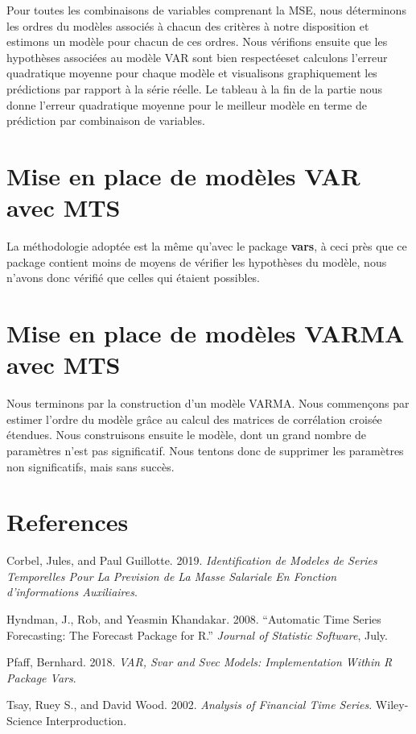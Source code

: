 \documentclass[12pt,]{article}
\begin{document}
Pour toutes les combinaisons de variables comprenant la MSE, nous
déterminons les ordres du modèles associés à chacun des critères à notre
disposition et estimons un modèle pour chacun de ces ordres. Nous
vérifions ensuite que les hypothèses associées au modèle VAR sont bien
respectéeset calculons l'erreur quadratique moyenne pour chaque modèle
et visualisons graphiquement les prédictions par rapport à la série
réelle. Le tableau à la fin de la partie nous donne l'erreur quadratique
moyenne pour le meilleur modèle en terme de prédiction par combinaison
de variables.

\section{Mise en place de modèles VAR avec
MTS}\label{mise-en-place-de-modeles-var-avec-mts}

La méthodologie adoptée est la même qu'avec le package \textbf{vars}, à
ceci près que ce package contient moins de moyens de vérifier les
hypothèses du modèle, nous n'avons donc vérifié que celles qui étaient
possibles.

\section{Mise en place de modèles VARMA avec
MTS}\label{mise-en-place-de-modeles-varma-avec-mts}

Nous terminons par la construction d'un modèle VARMA. Nous commençons
par estimer l'ordre du modèle grâce au calcul des matrices de
corrélation croisée étendues. Nous construisons ensuite le modèle, dont
un grand nombre de paramètres n'est pas significatif. Nous tentons donc
de supprimer les paramètres non significatifs, mais sans succès.

\newpage

\section*{References}\label{references}

\hypertarget{refs}{}
\hypertarget{ref-rapport}{}
Corbel, Jules, and Paul Guillotte. 2019. \emph{Identification de Modeles
de Series Temporelles Pour La Prevision de La Masse Salariale En
Fonction d'informations Auxiliaires}.

\hypertarget{ref-forecast}{}
Hyndman, J., Rob, and Yeasmin Khandakar. 2008. ``Automatic Time Series
Forecasting: The Forecast Package for R.'' \emph{Journal of Statistic
Software}, July.

\hypertarget{ref-vars}{}
Pfaff, Bernhard. 2018. \emph{VAR, Svar and Svec Models: Implementation
Within R Package Vars}.

\hypertarget{ref-MTS}{}
Tsay, Ruey S., and David Wood. 2002. \emph{Analysis of Financial Time
Series}. Wiley-Science Interproduction.
\end{document}
